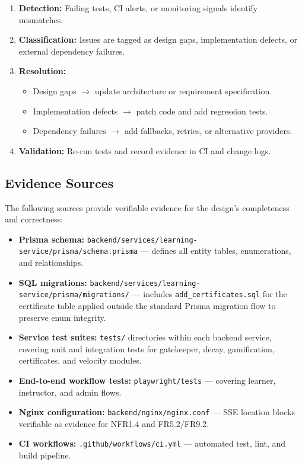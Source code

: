 \begin{enumerate}
    \item \textbf{Detection:} Failing tests, CI alerts, or monitoring signals identify mismatches.
    \item \textbf{Classification:} Issues are tagged as design gaps, implementation defects, or external dependency failures.
    \item \textbf{Resolution:}
        \begin{itemize}
            \item Design gaps $\rightarrow$ update architecture or requirement specification.
            \item Implementation defects $\rightarrow$ patch code and add regression tests.
            \item Dependency failures $\rightarrow$ add fallbacks, retries, or alternative providers.
        \end{itemize}
    \item \textbf{Validation:} Re-run tests and record evidence in CI and change logs.
\end{enumerate}

\subsection{Evidence Sources}

The following sources provide verifiable evidence for the design's completeness and correctness:

\begin{itemize}
    \item \textbf{Prisma schema:} \texttt{backend/services/learning-service/prisma/schema.prisma} — defines all entity tables, enumerations, and relationships.
    \item \textbf{SQL migrations:} \texttt{backend/services/learning-service/prisma/migrations/} — includes \texttt{add\_certificates.sql} for the certificate table applied outside the standard Prisma migration flow to preserve enum integrity.
    \item \textbf{Service test suites:} \texttt{tests/} directories within each backend service, covering unit and integration tests for gatekeeper, decay, gamification, certificates, and velocity modules.
    \item \textbf{End-to-end workflow tests:} \texttt{playwright/tests} — covering learner, instructor, and admin flows.
    \item \textbf{Nginx configuration:} \texttt{backend/nginx/nginx.conf} — SSE location blocks verifiable as evidence for NFR1.4 and FR5.2/FR9.2.
    \item \textbf{CI workflows:} \texttt{.github/workflows/ci.yml} — automated test, lint, and build pipeline.
\end{itemize}

\endinput
